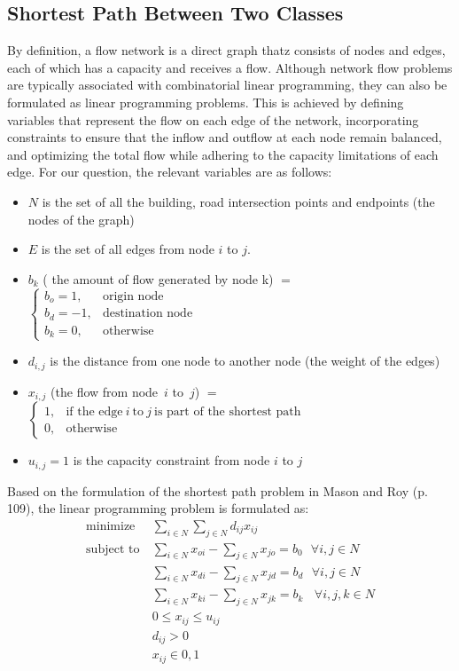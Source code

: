 \documentclass[12pt]{report}
\begin{document}
\subsection{Shortest Path Between Two Classes}
By definition, a flow network is a direct graph thatz consists of nodes and edges, each of which has a capacity and receives a flow. Although network flow problems are typically associated with combinatorial linear programming, they can also be formulated as linear programming problems. This is achieved by defining variables that represent the flow on each edge of the network, incorporating constraints to ensure that the inflow and outflow at each node remain balanced, and optimizing the total flow while adhering to the capacity limitations of each edge. For our question, the relevant variables are as follows: 
\begin{itemize}
    \item $N$ is the set of all the building, road intersection points and endpoints (the nodes of the graph)
    \item $E$ is the set of all edges from node $i$ to $j$.
    \item $b_k$ ( the amount of flow generated by node k) $=$
    $\begin{cases}
b_o=1, & \text{origin node} 
\\b_d=-1, & \text{destination node}
\\b_k=0,& \text{otherwise}
\end{cases} $
    
    \item $d_{i,j}$ is the distance from one node to another node (the weight of the edges)
    \item $x_{i,j}$ (the flow from node\ $i$  to\ $j$) $=$ $\begin{cases}
1, & \text{if the edge} \ i\ \text{to}\  j \ \text{is part of the shortest path} \\
0, & \text{otherwise}
\end{cases} $
\item $u_{i,j}=1$ is the capacity constraint from node $i$ to $j$
\end{itemize}
Based on the formulation of the shortest path problem in Mason and Roy (p. 109), the linear programming problem is formulated as: 
\begin{align*}
    \text{minimize} \ &\sum_{i\in N}\sum_{j\in N}d_{ij}x_{ij}
    \\ \text{subject to} \ &\sum_{i \in N}x_{oi} - \sum_{j\in N}x_{jo} = b_0 \ \ \ \forall i,j \in N
    \\  &\sum_{i \in N}x_{di} - \sum_{j\in N}x_{jd} = b_d \ \ \ \forall i,j \in N
    \\ \ &\sum_{i \in N}x_{ki} - \sum_{j\in N}x_{jk} = b_k \ \ \ \  \forall i,j,k\in N
    \\& 0\leq x_{ij}\leq u_{ij}
    \\& d_{ij} > 0
    \\ & x_{ij}\in {0,1}
\end{align*}
\end{document}
